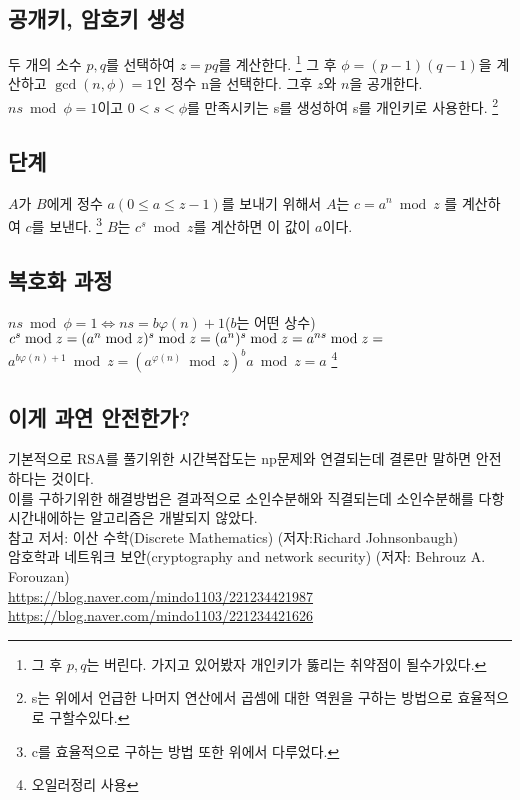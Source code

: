 \documentclass{oblivoir}
\begin{document}
\subsection{공개키, 암호키 생성}
두 개의 소수 $p,q$를 선택하여 $z=pq$를 계산한다.
\footnote{그 후 $p ,q$는 버린다. 가지고 있어봤자 개인키가 뚫리는 취약점이 될수가있다.}
 그 후 $\phi =(p-1)(q-1)$을 계산하고 $\gcd(n,\phi)=1$인 정수 n을 선택한다. 그후 $z$와 $n$을 공개한다.
  $ns\bmod \phi =1$이고 $0<s<\phi$를 만족시키는 s를 생성하여 s를 개인키로 사용한다.
\footnote{s는 위에서 언급한 나머지 연산에서 곱셈에 대한 역원을 구하는 방법으로 효율적으로  구할수있다.}\\
\subsection{단계}
$A$가 $B$에게 정수 $a(0\le a\le z-1)$를 보내기 위해서 $A$는 $c=a^n \bmod z$ 를 계산하여 $c$를 보낸다.
\footnote{c를 효율적으로 구하는 방법 또한 위에서 다루었다.}
$B$는 $c^s \bmod z$를 계산하면 이 값이 $a$이다.\\

\subsection{복호화 과정}

$ ns\bmod \phi =1 \Longleftrightarrow ns = b\varphi(n)+1$($b$는 어떤 상수)
\newline 
$c^s \bmod z=(a^n \bmod z)^s \bmod z = (a^n)^s \bmod z \newline = a^{ns}\bmod z =$
$a^{b\varphi(n)+1}\bmod z =(a^{\varphi(n)} \bmod z)^{b} a \bmod z =a$ \footnote{오일러정리 사용}

\subsection{이게 과연 안전한가?}
기본적으로 RSA를 풀기위한 시간복잡도는 np문제와 연결되는데 결론만 말하면 안전하다는 것이다. \\
이를 구하기위한 해결방법은 결과적으로 소인수분해와 직결되는데 소인수분해를 다항시간내에하는 알고리즘은 개발되지 않았다.\\



\newpage
참고 저서: 이산 수학(Discrete Mathematics) (저자:Richard Johnsonbaugh)\\
암호학과 네트워크 보안(cryptography and network security) (저자: Behrouz A. Forouzan)\\
\url{ https://blog.naver.com/mindo1103/221234421987}\\
\url{https://blog.naver.com/mindo1103/221234421626}
\end{document}
